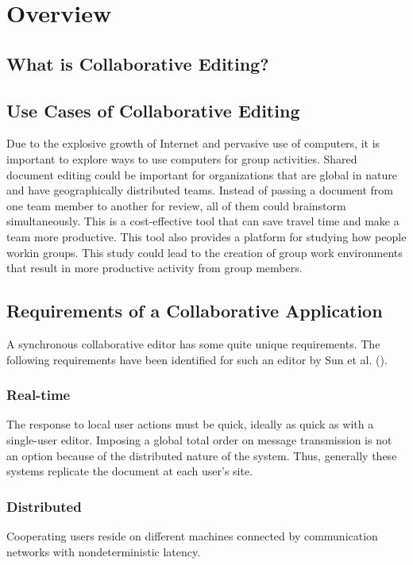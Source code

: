 \chapter{Overview}
\label{chapter:overview}



\section{What is Collaborative Editing?}



\section{Use Cases of Collaborative Editing}
Due to the explosive growth of Internet and pervasive use of computers, it is important to  explore ways to use computers for group activities. Shared document editing could be important for organizations that are global in nature and have geographically distributed  teams. Instead of passing a document from one team member to another for review, all of  them could brainstorm simultaneously. This is a cost-effective tool that can save travel time and make a team more productive.    This tool also provides a platform for studying how people workin groups. This study could lead to the creation of group work environments that result in more productive activity from group members.  


\section{Requirements of a Collaborative Application}
A synchronous collaborative editor has some quite unique requirements.
The following requirements have been identified for such an editor
by Sun et al. (\cite{sun98a}).

\subsection{Real-time} 
The response to local user actions must be quick, ideally
as quick as with a single-user editor. Imposing a global total order on
message transmission is not
an option because of the distributed nature of the system. Thus, generally 
these systems replicate the document at each user's site.

\subsection{Distributed} 
Cooperating users reside on different machines 
connected by communication networks with nondeterministic latency.

